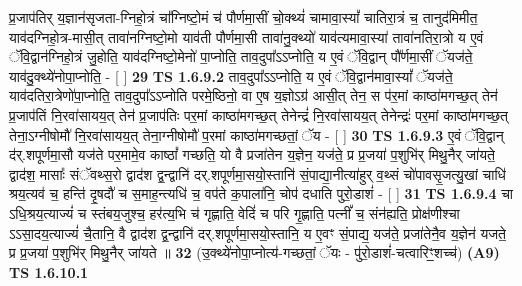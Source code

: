 \documentclass[17pt]{extarticle}
\begin{document}
                  प्र॒जाप॑तिर् य॒ज्ञान॑सृजता-ग्निहो॒त्रं चा᳚ग्निष्टो॒मं च॑ पौर्णमा॒सीं चो॒क्थ्यं॑ चामावा॒स्यां᳚ चातिरा॒त्रं च॒ तानुद॑मिमीत॒ याव॑दग्निहो॒त्र-मासी॒त् तावा॑नग्निष्टो॒मो याव॑ती पौर्णमा॒सी तावा॑नु॒क्थ्यो॑ याव॑त्यमावा॒स्या॑ तावा॑नतिरा॒त्रो य ए॒वं ॅवि॒द्वान॑ग्निहो॒त्रं जु॒होति॒ याव॑दग्निष्टो॒मेनो॑ पा॒प्नोति॒ ताव॒दुपा᳚ऽऽप्नोति॒ य ए॒वं ॅवि॒द्वान् पौ᳚र्णमा॒सीं ॅयज॑ते॒ याव॑दु॒क्थ्ये॑नोपा॒प्नोति॒ - [ ] \textbf{  29} \newline
                  \newline
                                \textbf{ TS 1.6.9.2} \newline
                  ताव॒दुपा᳚ऽऽप्नोति॒ य ए॒वं ॅवि॒द्वान॑मावा॒स्यां᳚ ॅयज॑ते॒ याव॑दतिरा॒त्रेणो॑पा॒प्नोति॒ ताव॒दुपा᳚ऽऽप्नोति परमे॒ष्ठिनो॒ वा ए॒ष य॒ज्ञोऽग्र॑ आसी॒त् तेन॒ स प॑र॒मां काष्ठा॑मगच्छ॒त् तेन॑ प्र॒जाप॑तिं नि॒रवा॑सायय॒त् तेन॑ प्र॒जाप॑तिः पर॒मां काष्ठा॑मगच्छ॒त् तेनेन्द्रं॑ नि॒रवा॑सायय॒त् तेनेन्द्रः॑ पर॒मां काष्ठा॑मगच्छ॒त् तेना॒ऽग्नीषोमौ॑ नि॒रवा॑सायय॒त् तेना॒ग्नीषोमौ॑ प॒रमां काष्ठा॑मगच्छतां॒ ॅय - [ ] \textbf{  30} \newline
                  \newline
                                \textbf{ TS 1.6.9.3} \newline
                  ए॒वं ॅवि॒द्वान् द॑र्.शपूर्णमा॒सौ यज॑ते पर॒मामे॒व काष्ठां᳚ गच्छति॒ यो वै प्रजा॑तेन य॒ज्ञेन॒ यज॑ते॒ प्र प्र॒जया॑ प॒शुभि॑र् मिथु॒नैर् जा॑यते॒ द्वाद॑श॒ मासाः᳚ संॅवथ्स॒रो द्वाद॑श द्व॒न्द्वानि॑ दर्.शपूर्णमा॒सयो॒स्तानि॑ सं॒पाद्या॒नीत्या॑हुर् व॒थ्सं चो॑पावसृ॒जत्यु॒खां चाधि॑ श्रय॒त्यव॑ च॒ हन्ति॑ दृ॒षदौ॑ च स॒माह॒न्त्यधि॑ च॒ वप॑ते क॒पाला॑नि॒ चोप॑ दधाति पुरो॒डाशं॑ - [ ] \textbf{  31} \newline
                  \newline
                                \textbf{ TS 1.6.9.4} \newline
                  चा ऽधि॒श्रय॒त्याज्यं॑ च स्तंबय॒जुश्च॒ हर॑त्य॒भि च॑ गृह्णाति॒ वेदिं॑ च परि गृ॒ह्णाति॒ पत्नीं᳚ च॒ संन॑ह्यति॒ प्रोक्ष॑णीश्चा ऽऽसा॒दय॒त्याज्यं॑ चै॒तानि॒ वै द्वाद॑श द्व॒न्द्वानि॑ दर्.शपूर्णमा॒सयो॒स्तानि॒ य ए॒वꣳ सं॒पाद्य॒ यज॑ते॒ प्रजा॑तेनै॒व य॒ज्ञेन॑ यजते॒ प्र प्र॒जया॑ प॒शुभि॑र् मिथु॒नैर् जा॑यते ॥ \textbf{  32} \newline
                  \newline
                      (उ॒क्थ्ये॑नोपा॒प्नोत्य॑-गच्छतां॒ ॅयः - पु॑रो॒डाशं॑-चत्वारिꣳ॒॒शच्च॑)  \textbf{(A9)} \newline \newline
                                        \textbf{ TS 1.6.10.1} \newline
\end{document}
